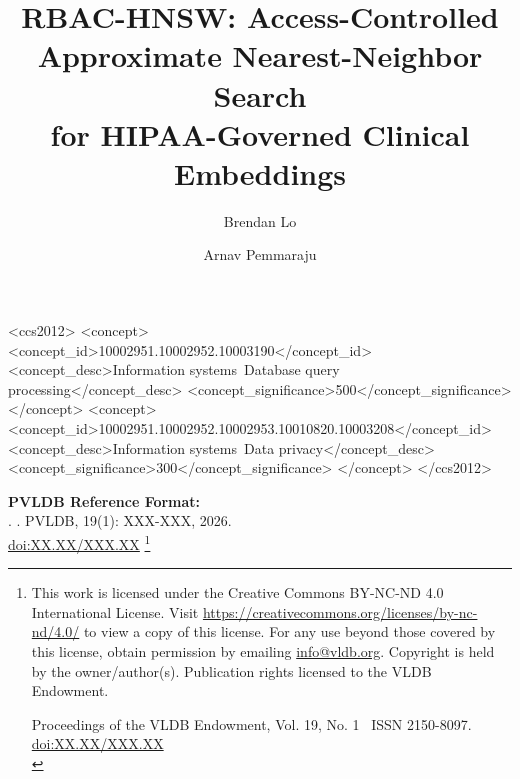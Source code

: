 \documentclass[sigconf, nonacm]{acmart}
\title{RBAC-HNSW: Access-Controlled Approximate Nearest-Neighbor Search\\
       for HIPAA-Governed Clinical Embeddings}
\author{Brendan Lo}
\affiliation{%
  \institution{University of Chicago}
  \city{Chicago}\state{IL}\country{USA}}
\author{Arnav Pemmaraju}
\affiliation{%
  \institution{Johns Hopkins University}
  \city{Baltimore}\state{MD}\country{USA}}
\newcommand\vldbdoi{XX.XX/XXX.XX}
\newcommand\vldbpages{XXX-XXX}
\newcommand\vldbvolume{19}
\newcommand\vldbissue{1}
\newcommand\vldbyear{2026}
\newcommand\vldbauthors{\authors}
\newcommand\vldbtitle{\shorttitle}
\newcommand\vldbpagestyle{plain}
\begin{document}


\begin{CCSXML}
<ccs2012>
 <concept>
  <concept_id>10002951.10002952.10003190</concept_id>
  <concept_desc>Information systems~Database query processing</concept_desc>
  <concept_significance>500</concept_significance>
 </concept>
 <concept>
  <concept_id>10002951.10002952.10002953.10010820.10003208</concept_id>
  <concept_desc>Information systems~Data privacy</concept_desc>
  <concept_significance>300</concept_significance>
 </concept>
</ccs2012>
\end{CCSXML}


\maketitle

\pagestyle{\vldbpagestyle}
\begingroup\small\noindent\raggedright\textbf{PVLDB Reference Format:}\\
\vldbauthors. \vldbtitle. PVLDB, \vldbvolume(\vldbissue): \vldbpages, \vldbyear.\\
\href{https://doi.org/\vldbdoi}{doi:\vldbdoi}
\endgroup
\begingroup
\renewcommand\thefootnote{}\footnote{\noindent
This work is licensed under the Creative Commons BY-NC-ND 4.0 International License. Visit \url{https://creativecommons.org/licenses/by-nc-nd/4.0/} to view a copy of this license. For any use beyond those covered by this license, obtain permission by emailing \href{mailto:info@vldb.org}{info@vldb.org}. Copyright is held by the owner/author(s). Publication rights licensed to the VLDB Endowment. \\
\raggedright Proceedings of the VLDB Endowment, Vol. \vldbvolume, No. \vldbissue\ %
ISSN 2150-8097. \\
\href{https://doi.org/\vldbdoi}{doi:\vldbdoi} \\
}\addtocounter{footnote}{-1}\endgroup
\end{document}
